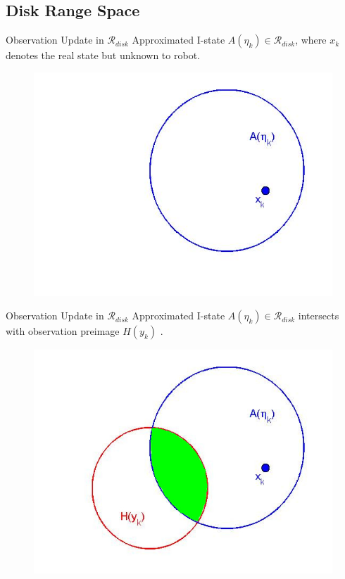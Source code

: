 \subsection[Disk Range Space]{Disk Range Space}
\begin{frame}{Observation Update in $\mathcal{R}_{disk}$}
  Approximated I-state $A(\eta_k) \in \mathcal{R}_{disk}$, where $x_k$ denotes
  the real state but unknown to robot.
			
    \begin{figure}
    \includegraphics[scale=0.3]{figs/circle1_2.jpg}
    \end{figure}
 
\end{frame}

\begin{frame}{Observation Update in  $\mathcal{R}_{disk}$}
  Approximated I-state $A(\eta_k) \in \mathcal{R}_{disk}$ intersects with
  observation preimage $H(y_k)$ .
			
    \begin{figure}
    \includegraphics[scale=0.3]{figs/circle2_2.jpg}
    \end{figure}
 		
\end{frame}

